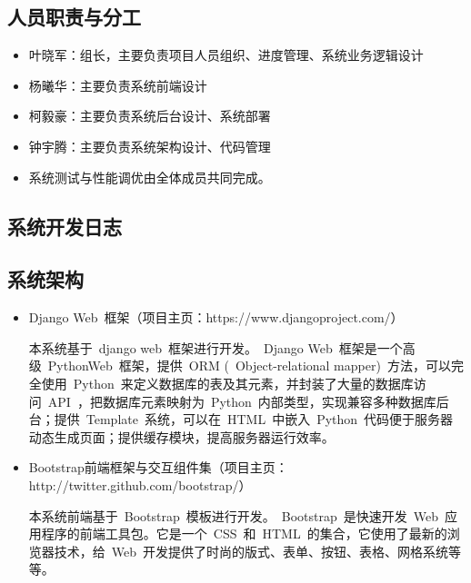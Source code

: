 \appendix
\begin{center}
  \section{人员职责与分工}
\end{center}

\begin{itemize}
  \item 叶晓军：组长，主要负责项目人员组织、进度管理、系统业务逻辑设计
  \item 杨曦华：主要负责系统前端设计
  \item 柯毅豪：主要负责系统后台设计、系统部署
  \item 钟宇腾：主要负责系统架构设计、代码管理
  \item 系统测试与性能调优由全体成员共同完成。
\end{itemize}


\newpage

\begin{center}
  \section{系统开发日志}
\end{center}
\subsection{系统架构}
\begin{itemize}
  \item Django Web~框架（项目主页：https://www.djangoproject.com/）
  
  \CJKindent 本系统基于~django web~框架进行开发。~Django Web~框架是一个高级~Python\footnotemark[1] Web~框架，提供~ORM (~Object-relational mapper)~方法，可以完全使用~Python~来定义数据库的表及其元素，并封装了大量的数据库访问~API~，把数据库元素映射为~Python~内部类型，实现兼容多种数据库后台；提供~Template~系统，可以在~HTML~中嵌入~Python~代码便于服务器动态生成页面；提供缓存模块，提高服务器运行效率。
  
  \item Bootstrap前端框架与交互组件集（项目主页：http://twitter.github.com/bootstrap/）
  
  \CJKindent 本系统前端基于~Bootstrap~模板进行开发。~Bootstrap~是快速开发~Web~应用程序的前端工具包。它是一个~CSS~和~HTML~的集合，它使用了最新的浏览器技术，给~Web~开发提供了时尚的版式、表单、按钮、表格、网格系统等等。
\end{itemize}

